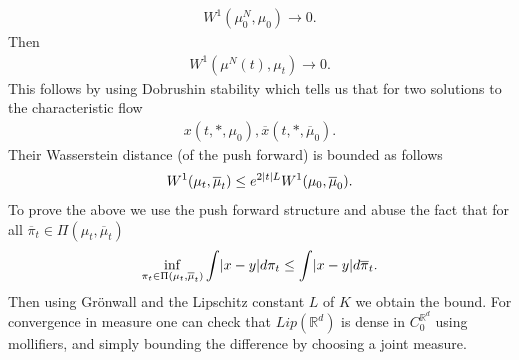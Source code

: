 \begin{align*}
 W^{1}(\mu_0^{N},\mu_0) \to 0
.\end{align*}
Then 
\begin{align*}
  W^{1}(\mu ^{N}(t) , \mu_t ) \to  0 
.\end{align*}
This follows by using Dobrushin stability which tells us that for two solutions to the characteristic flow 
\begin{align*}
  x(t,*,\mu_0) , \overline{x}(t,*,\overline{\mu }_0 ) 
.\end{align*}
Their Wasserstein distance (of the push forward) is bounded as follows
\begin{align*}
  W^{1}(\mu_t,\overline{\mu}_t )  \le  e^{2 \lvert t\rvert L}  W^{1}(\mu_0,\overline{\mu }_0 ) 
.\end{align*}
To prove the above we use the push forward structure and abuse the fact that for all $\overline{\pi }_t \in  \Pi(\mu_t,\overline{\mu }_t ) $
\begin{align*}
  \inf_{\pi_t \in \Pi(\mu_t,\overline{\mu }_t )} \int \lvert x-y\rvert d\pi_t \le  \int \lvert x-y\rvert d\overline{\pi}_t
.\end{align*}
Then using Grönwall and the Lipschitz constant $L$ of $K$ we obtain the bound.
For convergence in measure one can check that $Lip(\mathbb{R}^{d} )$ is dense in $C_0^{\mathbb{R}^{d} } $ using mollifiers, and simply bounding the difference by choosing 
a joint measure. 
